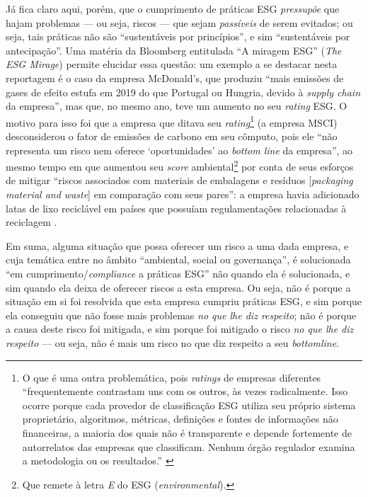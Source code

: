 \documentclass[12pt]{article}
\numberwithin{equation}{section}
\theoremstyle{plain}
\theoremstyle{definition}
\theoremstyle{remark}
\begin{document}
Já fica claro aqui, porém, que o cumprimento de práticas ESG \textit{pressupõe} que hajam problemas --- ou seja, riscos --- que sejam \textit{passíveis} de serem evitados; ou seja, tais práticas não são ``sustentáveis por princípios'', e sim ``sustentáveis por antecipação''. Uma matéria da Bloomberg entitulada ``A miragem ESG'' (\textit{The ESG Mirage}) \parencite{Simpson2021,BloombergOriginals2021} permite elucidar essa questão: um exemplo a se destacar nesta reportagem é o caso da empresa McDonald's, que produziu ``mais emissões de gases de efeito estufa em 2019 do que Portugal ou Hungria, devido à \textit{supply chain} da empresa'', mas que, no mesmo ano, teve um aumento no seu \textit{rating} ESG. O motivo para isso foi que a empresa que ditava seu \textit{rating}\footnote{O que é uma outra problemática, pois \textit{ratings} de empresas diferentes ``frequentemente contrastam uns com os outros, às vezes radicalmente. Isso ocorre porque cada provedor de classificação ESG utiliza seu próprio sistema proprietário, algoritmos, métricas, definições e fontes de informações não financeiras, a maioria dos quais não é transparente e depende fortemente de autorrelatos das empresas que classificam. Nenhum órgão regulador examina a metodologia ou os resultados.'' \parencite{Simpson2021}} (a empresa MSCI) desconsiderou o fator de emissões de carbono em seu cômputo, pois ele ``não representa um risco nem oferece `oportunidades' ao \textit{bottom line} da empresa'', ao mesmo tempo em que aumentou seu \textit{score} ambiental\footnote{Que remete à letra \textit{E} do ESG (\textit{environmental}).} por conta de seus esforços de mitigar ``riscos associados com materiais de embalagens e resíduos [\textit{packaging material and waste}] em comparação com seus pares'': a empresa havia adicionado latas de lixo reciclável em países que possuíam regulamentações relacionadas à reciclagem \parencite{Simpson2021}. 

Em suma, alguma situação que possa oferecer um risco a uma dada empresa, e cuja temática entre no âmbito ``ambiental, social ou governança'', é solucionada ``em cumprimento/\textit{compliance} a práticas ESG'' não quando ela é solucionada, e sim quando ela deixa de oferecer riscos a esta empresa. Ou seja, não é porque a situação em si foi resolvida que esta empresa cumpriu práticas ESG, e sim porque ela conseguiu que não fosse mais problemas \textit{no que lhe diz respeito}; não é porque a causa deste risco foi mitigada, e sim porque foi mitigado o risco \textit{no que lhe diz respeito} --- ou seja, não é mais um risco no que diz respeito a seu \textit{bottomline}.
\end{document}
